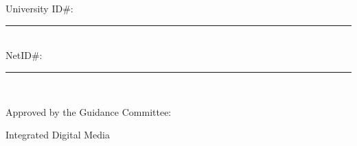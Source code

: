 \noindent
\makebox[\textwidth]{\hfill\makebox[2.5in]{\hrulefill}}\\
\vspace{0.05in}

\noindent
\makebox[\textwidth]{\hfill\makebox[2.5in]{\hrulefill}}\\
\vspace{0.05in}

\vspace{-0.01in}
\noindent
\begin{doublespace}
University ID\#:\hspace{3pt} \noindent\rule[-3pt]{2in}{0.4pt}\\
\vspace{0.25in}
NetID\#: \hspace{35pt} \noindent\rule[-3pt]{2in}{0.4pt}\\
\end{doublespace}

\vspace{-0.25in}
\noindent
Approved by the Guidance Committee:
\singlespacing

\noindent
Integrated Digital Media
\vspace{0.1in}